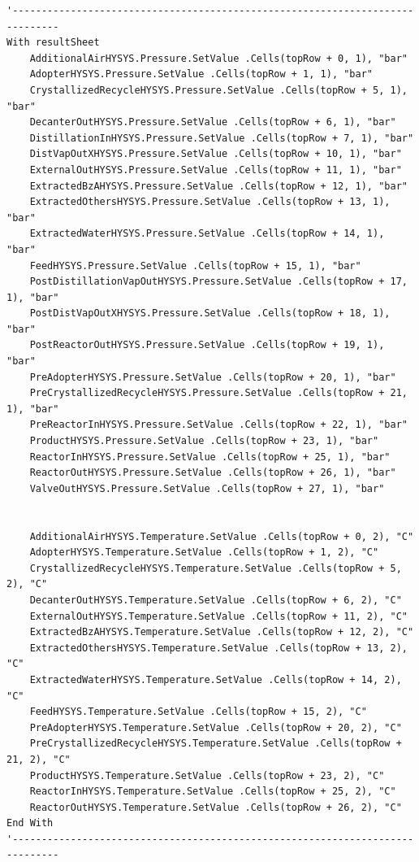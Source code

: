 \documentclass[a4j]{jsreport}
\begin{document}
\begin{lstlisting}[caption=HYSYSとpythonを繋ぐコード]
'------------------------------------------------------------------------------
With resultSheet
    AdditionalAirHYSYS.Pressure.SetValue .Cells(topRow + 0, 1), "bar"
    AdopterHYSYS.Pressure.SetValue .Cells(topRow + 1, 1), "bar"
    CrystallizedRecycleHYSYS.Pressure.SetValue .Cells(topRow + 5, 1), "bar"
    DecanterOutHYSYS.Pressure.SetValue .Cells(topRow + 6, 1), "bar"
    DistillationInHYSYS.Pressure.SetValue .Cells(topRow + 7, 1), "bar"
    DistVapOutXHYSYS.Pressure.SetValue .Cells(topRow + 10, 1), "bar"
    ExternalOutHYSYS.Pressure.SetValue .Cells(topRow + 11, 1), "bar"
    ExtractedBzAHYSYS.Pressure.SetValue .Cells(topRow + 12, 1), "bar"
    ExtractedOthersHYSYS.Pressure.SetValue .Cells(topRow + 13, 1), "bar"
    ExtractedWaterHYSYS.Pressure.SetValue .Cells(topRow + 14, 1), "bar"
    FeedHYSYS.Pressure.SetValue .Cells(topRow + 15, 1), "bar"
    PostDistillationVapOutHYSYS.Pressure.SetValue .Cells(topRow + 17, 1), "bar"
    PostDistVapOutXHYSYS.Pressure.SetValue .Cells(topRow + 18, 1), "bar"
    PostReactorOutHYSYS.Pressure.SetValue .Cells(topRow + 19, 1), "bar"
    PreAdopterHYSYS.Pressure.SetValue .Cells(topRow + 20, 1), "bar"
    PreCrystallizedRecycleHYSYS.Pressure.SetValue .Cells(topRow + 21, 1), "bar"
    PreReactorInHYSYS.Pressure.SetValue .Cells(topRow + 22, 1), "bar"
    ProductHYSYS.Pressure.SetValue .Cells(topRow + 23, 1), "bar"
    ReactorInHYSYS.Pressure.SetValue .Cells(topRow + 25, 1), "bar"
    ReactorOutHYSYS.Pressure.SetValue .Cells(topRow + 26, 1), "bar"
    ValveOutHYSYS.Pressure.SetValue .Cells(topRow + 27, 1), "bar"


    AdditionalAirHYSYS.Temperature.SetValue .Cells(topRow + 0, 2), "C"
    AdopterHYSYS.Temperature.SetValue .Cells(topRow + 1, 2), "C"
    CrystallizedRecycleHYSYS.Temperature.SetValue .Cells(topRow + 5, 2), "C"
    DecanterOutHYSYS.Temperature.SetValue .Cells(topRow + 6, 2), "C"
    ExternalOutHYSYS.Temperature.SetValue .Cells(topRow + 11, 2), "C"
    ExtractedBzAHYSYS.Temperature.SetValue .Cells(topRow + 12, 2), "C"
    ExtractedOthersHYSYS.Temperature.SetValue .Cells(topRow + 13, 2), "C"
    ExtractedWaterHYSYS.Temperature.SetValue .Cells(topRow + 14, 2), "C"
    FeedHYSYS.Temperature.SetValue .Cells(topRow + 15, 2), "C"
    PreAdopterHYSYS.Temperature.SetValue .Cells(topRow + 20, 2), "C"
    PreCrystallizedRecycleHYSYS.Temperature.SetValue .Cells(topRow + 21, 2), "C"
    ProductHYSYS.Temperature.SetValue .Cells(topRow + 23, 2), "C"
    ReactorInHYSYS.Temperature.SetValue .Cells(topRow + 25, 2), "C"
    ReactorOutHYSYS.Temperature.SetValue .Cells(topRow + 26, 2), "C"
End With
'------------------------------------------------------------------------------


\end{lstlisting}
\end{document}

